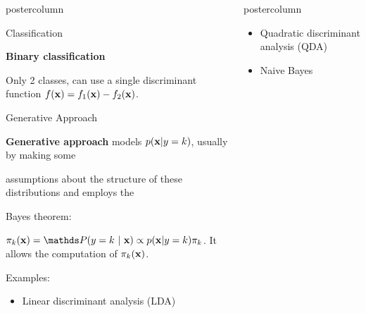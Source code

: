 \documentclass{beamer}
\newlength{\columnheight} %
\begin{document}
\begin{frame}[fragile]{}
\begin{columns}
\begin{column}{.31\textwidth}
\begin{beamercolorbox}[center]{postercolumn}
\begin{minipage}{.98\textwidth}
{\begin{myblock}{Classification}
						\begin{codebox}
							 \textbf{Binary classification}
						\end{codebox}
            Only 2 classes, can use a single discriminant function $f(\mathbf{x}) = f_{1}(\mathbf{x}) - f_{2}(\mathbf{x})$.
          \end{myblock}
\begin{myblock}{Generative Approach}
\begin{codebox}
\textbf{Generative approach} models $p(\mathbf{x} | y= k)$, usually by making some
\end{codebox}

\begin{codebox}
assumptions about the structure of these distributions and employs the
\end{codebox}

\begin{codebox}
Bayes theorem:
  \end{codebox}
\hspace*{1ex}$\pikx = \postk \propto \pdfxyk \pik$. It allows the computation of \hspace*{1ex}$\pi_{k}(\mathbf{x})$.

\begin{codebox}
  Examples:
\end{codebox}
  
  \begin{itemize}[$\bullet$]     
  \setlength{\itemindent}{+.3in}
    \item Linear discriminant analysis (LDA)
  \end{itemize}
					\end{myblock}\vfill
          }
        \end{minipage}
          \end{beamercolorbox}
        \end{column}
	
	\begin{column}{.31\textwidth}
	\begin{beamercolorbox}[center]{postercolumn}
	
	\begin{minipage}{.98\textwidth}
\parbox[t][\columnheight]{\textwidth}{
  \begin{myblock}{}
  
  \begin{itemize}[$\bullet$]    
  \setlength{\itemindent}{+.3in}
    \item Quadratic discriminant analysis (QDA)
    \item Naive Bayes
  \end{itemize}
  

\end{myblock}}
\end{minipage}
\end{beamercolorbox}
\end{column}
\end{columns}
\end{frame}
\end{document}
